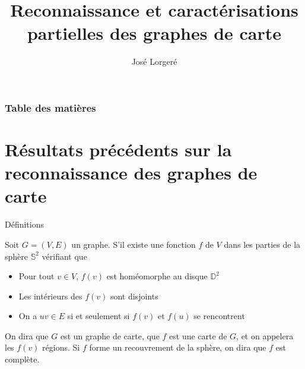 \documentclass{beamer}
\title{Reconnaissance et caractérisations partielles des graphes de carte}
\author{José Lorgeré}
\institute{Encadré par Vincent Limouzy}
\begin{document}
\frame{\titlepage}

\begin{frame}
    \frametitle{Table des matières}

    \tableofcontents

\end{frame}


\section{Résultats précédents sur la reconnaissance des graphes de carte}

\begin{frame}{Définitions}

    \begin{definition}
        Soit $G = (V, E)$ un graphe. S'il existe une fonction $f$ de $V$ dans les parties de la sphère $\mathbb{S}^2$ vérifiant que
        \begin{itemize}
            \item Pour tout $v \in V$, $f(v)$ est homéomorphe au disque $\mathbb{D}^2$
            \item Les intérieurs des $f(v)$ sont disjoints
            \item On a $uv \in E$ si et seulement si $f(v)$ et $f(u)$ se rencontrent
        \end{itemize}
        On dira que $G$ est un graphe de carte, que $f$ est une carte de $G$, et on appelera les $f(v)$ régions.
        Si $f$ forme un recouvrement de la sphère, on dira que $f$ est complète.
    \end{definition}

\end{frame}
\end{document}
